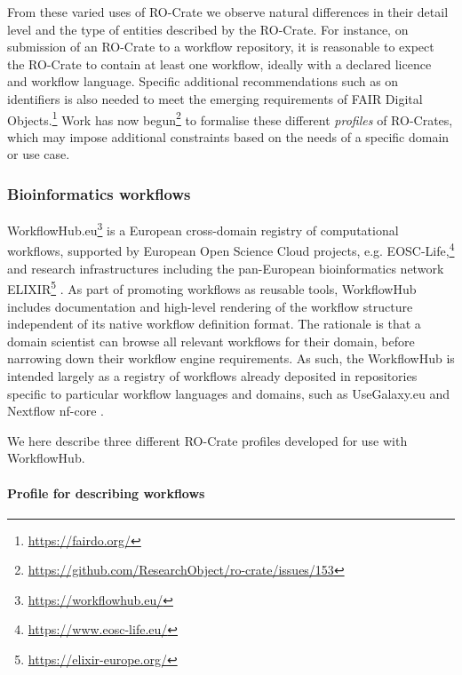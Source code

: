 From these varied uses of RO-Crate we observe natural differences in
their detail level and the type of entities described by the RO-Crate.
For instance, on submission of an RO-Crate to a workflow repository, it
is reasonable to expect the RO-Crate to contain at least one workflow,
ideally with a declared licence and workflow language. Specific
additional recommendations such as on identifiers is also needed to meet
the emerging requirements of FAIR Digital
Objects.\footnote{\url{https://fairdo.org/}} Work has now
begun\footnote{\url{https://github.com/ResearchObject/ro-crate/issues/153}} to
formalise these different \textit{profiles} of RO-Crates, which may impose
additional constraints based on the needs of a specific domain or use case.


\subsubsection{Bioinformatics workflows}\label{ch5:workflows}

WorkflowHub.eu\footnote{\url{https://workflowhub.eu/}} is a European cross-domain
registry of computational workflows, supported by European Open Science
Cloud projects, e.g. EOSC-Life,\footnote{\url{https://www.eosc-life.eu/}} and
research infrastructures including the pan-European bioinformatics
network ELIXIR\footnote{\url{https://elixir-europe.org/}}
\cite{Crosswell 2012}. As part
of promoting workflows as reusable tools, WorkflowHub includes
documentation and high-level rendering of the workflow structure
independent of its native workflow definition format. The rationale is
that a domain scientist can browse all relevant workflows for their
domain, before narrowing down their workflow engine requirements. As
such, the WorkflowHub is intended largely as a registry of workflows
already deposited in repositories specific to particular workflow
languages and domains, such as UseGalaxy.eu
\cite{Baker 2020} and
Nextflow nf-core
\cite{Ewels 2020}.

We here describe three different RO-Crate profiles developed for use
with WorkflowHub.

\paragraph{Profile for describing workflows}
\label{ch5:profile-for-describing-workflows}

